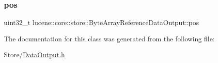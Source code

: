 \subsubsection{\texorpdfstring{pos}{pos}}
{\footnotesize\ttfamily uint32\+\_\+t lucene\+::core\+::store\+::\+Byte\+Array\+Reference\+Data\+Output\+::pos\hspace{0.3cm}{\ttfamily [private]}}



The documentation for this class was generated from the following file\+:\begin{DoxyCompactItemize}
\item 
Store/\mbox{\hyperlink{DataOutput_8h}{Data\+Output.\+h}}\end{DoxyCompactItemize}
